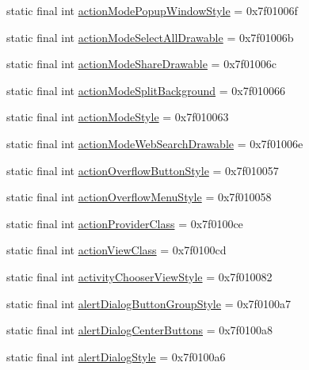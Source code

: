 \begin{CompactItemize}
static final int \hyperlink{classandroid_1_1support_1_1transition_1_1_r_1_1attr_442ef3f650ac491c05d31f539adc3ada}{actionModePopupWindowStyle} = 0x7f01006f
\item 
static final int \hyperlink{classandroid_1_1support_1_1transition_1_1_r_1_1attr_6ee9e9fb5de870ec16df80560d32accb}{actionModeSelectAllDrawable} = 0x7f01006b
\item 
static final int \hyperlink{classandroid_1_1support_1_1transition_1_1_r_1_1attr_0631f612f456dd25a7287f38ec84b014}{actionModeShareDrawable} = 0x7f01006c
\item 
static final int \hyperlink{classandroid_1_1support_1_1transition_1_1_r_1_1attr_7e035993a5831b1f274551090afd8345}{actionModeSplitBackground} = 0x7f010066
\item 
static final int \hyperlink{classandroid_1_1support_1_1transition_1_1_r_1_1attr_31dae4d5c8487185b2423aed671f1b76}{actionModeStyle} = 0x7f010063
\item 
static final int \hyperlink{classandroid_1_1support_1_1transition_1_1_r_1_1attr_bb7b1fba361d8a2ac916303aa9e34942}{actionModeWebSearchDrawable} = 0x7f01006e
\item 
static final int \hyperlink{classandroid_1_1support_1_1transition_1_1_r_1_1attr_27e0145b9c20d247cb46ddd239f3fcb2}{actionOverflowButtonStyle} = 0x7f010057
\item 
static final int \hyperlink{classandroid_1_1support_1_1transition_1_1_r_1_1attr_2946eba70c02cd6bb6b53c224ffe37c8}{actionOverflowMenuStyle} = 0x7f010058
\item 
static final int \hyperlink{classandroid_1_1support_1_1transition_1_1_r_1_1attr_18ff34e10c70f175292c3eb154d860df}{actionProviderClass} = 0x7f0100ce
\item 
static final int \hyperlink{classandroid_1_1support_1_1transition_1_1_r_1_1attr_2723950ce51bbc8cffebda0575e67c0b}{actionViewClass} = 0x7f0100cd
\item 
static final int \hyperlink{classandroid_1_1support_1_1transition_1_1_r_1_1attr_6e14936ba9ac14adb09c87680b41f96e}{activityChooserViewStyle} = 0x7f010082
\item 
static final int \hyperlink{classandroid_1_1support_1_1transition_1_1_r_1_1attr_76b50abdc3119b14a28e0041dc3dd775}{alertDialogButtonGroupStyle} = 0x7f0100a7
\item 
static final int \hyperlink{classandroid_1_1support_1_1transition_1_1_r_1_1attr_dfe6671468c472ac89b0330f73f823de}{alertDialogCenterButtons} = 0x7f0100a8
\item 
static final int \hyperlink{classandroid_1_1support_1_1transition_1_1_r_1_1attr_94b0c050e565c3457815aa0b8b0c9fe7}{alertDialogStyle} = 0x7f0100a6

\end{CompactItemize}
